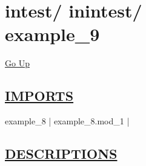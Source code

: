 \chapter*{\color{headfile}
{\large intest\slash\hspace{0pt}}
{\large inintest\slash\hspace{0pt}}
 \\
example_9
}
\hypertarget{ecldoc:toc:intest.inintest.example_9}{}
\hyperlink{ecldoc:toc:root/intest/inintest}{Go Up}

\section*{\underline{\textsf{IMPORTS}}}
\begin{doublespace}
{\large
example\_8 |
example\_8.mod\_1 |
}
\end{doublespace}

\section*{\underline{\textsf{DESCRIPTIONS}}}
